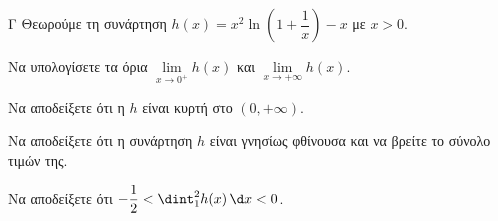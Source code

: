 \begin{thema}{Γ}
Θεωρούμε τη συνάρτηση $h(x) = x^2 \ln\left(1 + \dfrac{1}{x}\right) - x$ με $x > 0$.
\begin{erwthma}
  \item Να υπολογίσετε τα όρια $\lim\limits_{x \to 0^+} h(x)$ και $\lim\limits_{x \to +\infty} h(x)$.
  \item Να αποδείξετε ότι η $h$ είναι κυρτή στο $(0, +\infty)$.
  \item Να αποδείξετε ότι η συνάρτηση $h$ είναι γνησίως φθίνουσα και να βρείτε το σύνολο τιμών της.
  \item Να αποδείξετε ότι $-\dfrac{1}{2} < \dint_1^2 h(x) \, \d x < 0$.
\end{erwthma}
\end{thema}
